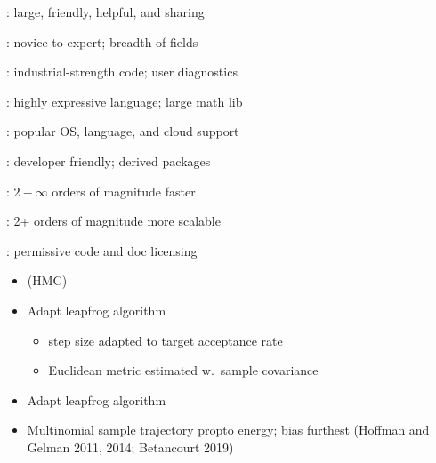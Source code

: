 \documentclass[10pt]{report}
\begin{document}
\begin{subitemize}
\item {}: large, friendly, helpful, and sharing
\item {}:  novice to expert; breadth of fields
\item {}:  industrial-strength code; user diagnostics
\item {}:  highly expressive language;  large math lib
\item {}: popular OS, language, and cloud support
\item {}: developer friendly; derived packages
\item {}:  $2-\infty$ orders of magnitude faster
\item {}:  2+ orders of magnitude more scalable
\item {}: permissive code and doc licensing
\end{subitemize}


%
\begin{itemize}
\item {} (HMC)
\item Adapt leapfrog algorithm 
  \vspace*{-4pt}
  \begin{itemize}\small
  \item step size adapted to target acceptance rate
  \item Euclidean metric estimated w.\ sample covariance
  \end{itemize}
\item Adapt leapfrog algorithm  
\item Multinomial sample trajectory propto energy; bias furthest
\vfill
\hfill
{\footnotesize (Hoffman and Gelman 2011, 2014; Betancourt 2019)}
\end{itemize}
\end{document}
